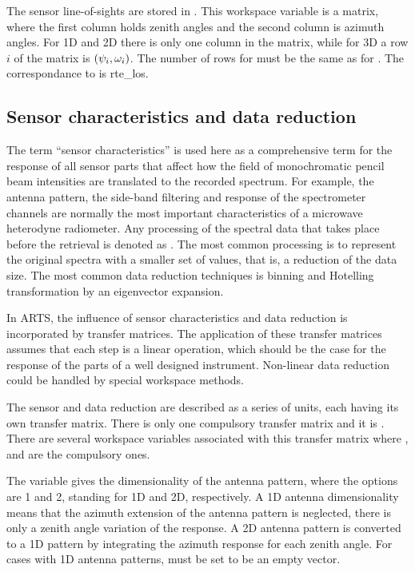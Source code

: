 The sensor line-of-sights are stored in . This workspace
variable is a matrix, where the first column holds zenith angles and the second
column is azimuth angles. For 1D and 2D there is only one column in the matrix,
while for 3D a row $i$ of the matrix is $(\psi_{i},\omega_{i})$. The number
of rows for  must be the same as for
. The correspondance to  is
{rte\_los}.


\subsection{Sensor characteristics and data reduction}
\label{sec:fm_defs:sensorchar}

The term ``sensor characteristics'' is
used here as a comprehensive term for the response of all sensor parts
that affect how the field of monochromatic pencil beam intensities are
translated to the recorded spectrum. For example, the antenna pattern,
the side-band filtering and response of the spectrometer channels are
normally the most important characteristics of a microwave heterodyne
radiometer. Any processing of the spectral data that takes place
before the retrieval is denoted as . The
most common processing is to represent the original spectra with a
smaller set of values, that is, a reduction of the data size. The most
common data reduction techniques is binning and Hotelling
transformation by an eigenvector expansion.

In ARTS, the influence of sensor characteristics and data reduction is
incorporated by transfer matrices. The
application of these transfer matrices assumes that each step is a
linear operation, which should be the case for the response of the
parts of a well designed instrument. Non-linear data reduction could
be handled by special workspace methods.

The sensor and data reduction are described as a series of units, each
having its own transfer matrix.  There is only one compulsory transfer
matrix and it is . There are several workspace
variables associated with this transfer matrix where
,  and
 are the compulsory ones.

The variable  gives the dimensionality of the
antenna pattern, where the
options are 1 and 2, standing for 1D and 2D, respectively. A 1D
antenna dimensionality means that the azimuth extension of the
antenna pattern is neglected, there is only a zenith angle variation
of the response. A 2D antenna pattern is converted to a 1D pattern by
integrating the azimuth response for each zenith angle. For cases
with 1D antenna patterns,  must be set to
be an empty vector.



